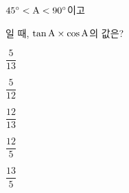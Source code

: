 $45^\circ<\mathrm{A}<90^\circ$이고\par\smallskip{}\par\smallskip\noindent 일 때, $\tan\mathrm{A}\times\cos\mathrm{A}$의 값은?
\begin{choices32}{\rule[-3ex]{0pt}{8ex}$\dfrac{5}{13}$}{\rule[-3ex]{0pt}{8ex}$\dfrac{5}{12}$}{\rule[-3ex]{0pt}{8ex}$\dfrac{12}{13}$}{\rule[-3ex]{0pt}{8ex}$\dfrac{12}{5}$}{\rule[-3ex]{0pt}{8ex}$\dfrac{13}{5}$}\end{choices32}
